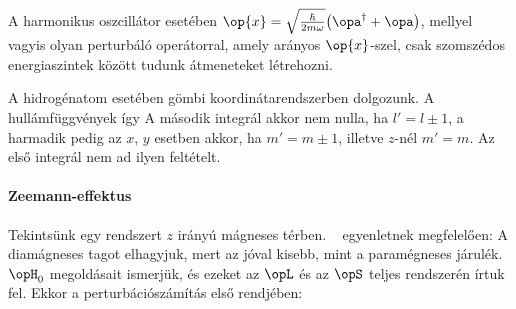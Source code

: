     A harmonikus oszcillátor esetében $\op{x}=\sqrt{\frac{\hbar}{2m\omega}}\big(\opa^\dagger+\opa\big)$, mellyel
    vagyis olyan perturbáló operátorral, amely arányos $\op{x}$-szel, csak szomszédos energiaszintek között tudunk átmeneteket létrehozni.
    
    A hidrogénatom esetében gömbi koordinátarendszerben dolgozunk.
   A hullámfüggvények 
    így
    A második integrál akkor nem nulla, ha $l'=l\pm1$, a harmadik pedig az $x$, $y$ esetben akkor, ha $m'=m\pm 1$, illetve $z$-nél $m'=m$.
   Az első integrál nem ad ilyen feltételt. 
    
   \paragraph{Zeemann-effektus}
    
    Tekintsünk egy rendszert $z$ irányú mágneses térben. ~ egyenletnek megfelelően:
    A diamágneses tagot elhagyjuk, mert az jóval kisebb, mint a paramégneses járulék. $\opH_0$ megoldásait ismerjük, és ezeket az $\opL$ és az $\opS$ teljes rendszerén írtuk fel.
   Ekkor a perturbációszámítás első rendjében:
    
